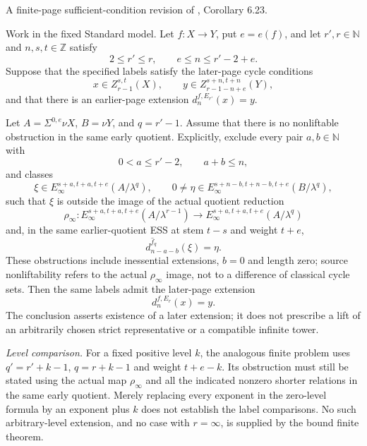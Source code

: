 \begin{corollary}
\label{paper:6.23}
A finite-page sufficient-condition revision of \cite{LWX126}, Corollary 6.23.\par
\label{cor:dfc6043e}
Work in the fixed Standard model. Let $f:X\to Y$, put $e=e(f)$, and let $r',r\in\mathbb N$ and $n,s,t\in\mathbb Z$ satisfy
\[
2\le r'\le r,\qquad e\le n\le r'-2+e.
\]
Suppose that the specified labels satisfy the later-page cycle conditions
\[
x\in Z_{r-1}^{s,t}(X),\qquad
y\in Z_{r-1-n+e}^{s+n,t+n}(Y),
\]
and that there is an earlier-page extension $d_n^{f,E_{r'}}(x)=y$.

Let $A=\Sigma^{0,e}\nu X$, $B=\nu Y$, and $q=r'-1$. Assume that there is no nonliftable obstruction in the same early quotient. Explicitly, exclude every pair $a,b\in\mathbb N$ with
\[
0<a\le r'-2,\qquad a+b\le n,
\]
and classes
\[
\xi\in E_\infty^{s+a,t+a,t+e}(A/\lambda^q),\qquad
0\ne\eta\in E_\infty^{s+n-b,t+n-b,t+e}(B/\lambda^q),
\]
such that $\xi$ is outside the image of the actual quotient reduction
\[
\rho_\infty:E_\infty^{s+a,t+a,t+e}(A/\lambda^{r-1})
\longrightarrow E_\infty^{s+a,t+a,t+e}(A/\lambda^q)
\]
and, in the same earlier-quotient ESS at stem $t-s$ and weight $t+e$,
\[
d_{n-a-b}^{\hat f_q}(\xi)=\eta.
\]
These obstructions include inessential extensions, $b=0$ and length zero; source nonliftability refers to the actual $\rho_\infty$ image, not to a difference of classical cycle sets. Then the same labels admit the later-page extension
\[
d_n^{f,E_r}(x)=y.
\]
The conclusion asserts existence of a later extension; it does not prescribe a lift of an arbitrarily chosen strict representative or a compatible infinite tower.

\textit{Level comparison.}
For a fixed positive level $k$, the analogous finite problem uses
$q'=r'+k-1$, $q=r+k-1$ and weight $t+e-k$.
Its obstruction must still be stated using the actual map
$\rho_\infty$ and all the indicated nonzero shorter relations in
the same early quotient. Merely replacing every exponent in the
zero-level formula by an exponent plus $k$ does not establish the
label comparisons. No such arbitrary-level extension, and no
case with $r=\infty$, is supplied by the bound finite theorem.
\end{corollary}
